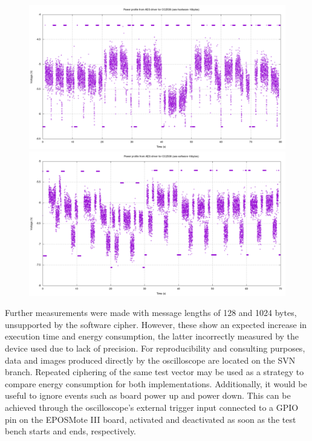 \documentclass{../sftex/sftex}
\begin{document}
\begin{figure}[ht]
  \centering
  \includegraphics[width=\textwidth]{support/aes-hardware-16bytes.png}
  \includegraphics[width=\textwidth]{support/aes-software-16bytes.png}
\end{figure}

Further measurements were made with message lengths of 128 and 1024 bytes,
unsupported by the software cipher. However, these show an expected increase in
execution time and energy consumption, the latter incorrectly measured by the
device used due to lack of precision. For reproducibility and consulting
purposes, data and images produced directly by the oscilloscope are located on
the SVN branch. Repeated ciphering of the same test vector may be used as a
strategy to compare energy consumption for both implementations. Additionally,
it would be useful to ignore events such as board power up and power down. This
can be achieved through the oscilloscope's external trigger input connected to
a GPIO pin on the EPOSMote III board, activated and deactivated as soon as the
test bench starts and ends, respectively.
\end{document}
